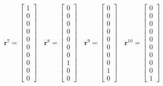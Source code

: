 \documentclass[11pt, reqno]{amsart}
\newcommand{\mvec}[1]{\mathbf{#1}}
\theoremstyle{definition}
\begin{document}
\begin{align}
  \mvec{r}^{7}
  =
  \left[
    \begin{matrix}
      1 \\
      0 \\
      0 \\
      0 \\
      0 \\
      0 \\
      0 \\
      0 \\
      0 \\
      0
    \end{matrix}
  \right]
  \quad
  \mvec{r}^{8}
  =
  \left[
    \begin{matrix}
      0 \\
      0 \\
      0 \\
      0 \\
      0 \\
      0 \\
      0 \\
      1 \\
      0 \\
      0
    \end{matrix}
  \right]
  \quad
  \mvec{r}^{9}
  =
  \left[
    \begin{matrix}
      0 \\
      0 \\
      0 \\
      0 \\
      0 \\
      0 \\
      0 \\
      0 \\
      1 \\
      0
    \end{matrix}
  \right]
  \quad
  \mvec{r}^{10}
  =
  \left[
    \begin{matrix}
      0 \\
      0 \\
      0 \\
      0 \\
      0 \\
      0 \\
      0 \\
      0 \\
      0 \\
      1
    \end{matrix}
  \right]
\end{align}
\end{document}
